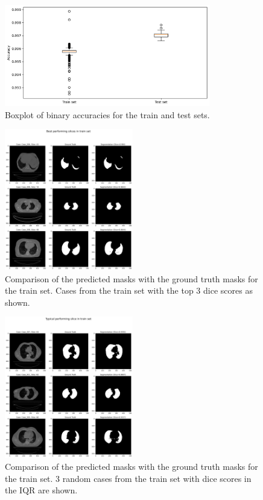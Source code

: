\documentclass[11pt]{article}
\begin{document}
\begin{figure}[H]
    \centering
    \includegraphics[width=0.8\textwidth]{figs/accuracy_boxplot.png}
    \caption{Boxplot of binary accuracies for the train and test sets.}
    \label{fig:accuracy_dist_box}

\end{figure}

\begin{figure}[H]
    \centering
    \includegraphics[width=0.5\textwidth]{figs/Best performing slices in train set.png}
    \caption{Comparison of the predicted masks with the ground truth masks for the train set. Cases from the train set with the top 3 dice scores as shown.}
    \label{fig:best_train_mask_comparison}
\end{figure}

\begin{figure}[H]
    \centering
    \includegraphics[width=0.5\textwidth]{figs/Typical performing slice in train set.png}
    \caption{Comparison of the predicted masks with the ground truth masks for the train set. 3 random cases from the train set with dice scores in the IQR are shown.}
    \label{fig:typical_train_mask_comparison}
\end{figure}
\end{document}
